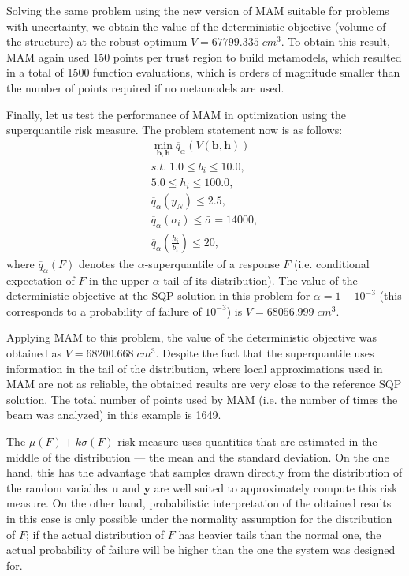 \documentclass{llncs}
\begin{document}
Solving the same problem using the new version of MAM suitable for problems with uncertainty, we obtain the value of the deterministic objective (volume of the structure) at the robust optimum $V = 67799.335\; cm^3$. To obtain this result, MAM again used 150 points per trust region to build metamodels, which resulted in a total of 1500 function evaluations, which is orders of magnitude smaller than the number of points required if no metamodels are used.

Finally, let us test the performance of MAM in optimization using the superquantile risk measure. The problem statement now is as follows:
\begin{displaymath}
  \begin{array}{c}
    \min\limits_{\boldsymbol b, \boldsymbol h} \overline{q}_\alpha \left(V(\boldsymbol b, \boldsymbol h)\right) \\
    s.t.\;1.0 \le b_i \le 10.0, \\
    5.0 \le h_i \le 100.0, \\    
		\overline{q}_\alpha \left(y_N\right) \le 2.5, \\
    \overline{q}_\alpha \left(\sigma_i\right) \le \bar{\sigma} = 14000, \\
    \overline{q}_\alpha \left(\frac{h_i}{b_i}\right)\le 20,
  \end{array}
\end{displaymath}
where $\overline{q}_\alpha \left(F\right) $ denotes the $\alpha$-superquantile of a response $F$ (i.e. conditional expectation of $F$ in the upper $\alpha$-tail of its distribution). The value of the deterministic objective at the SQP solution in this problem for $\alpha = 1-10^{-3}$ (this corresponds to a probability of failure of $10^{-3}$) is $V = 68056.999\; cm^3$.

Applying MAM to this problem, the value of the deterministic objective was obtained as $V = 68200.668\; cm^3$. Despite the fact that the superquantile uses information in the tail of the distribution, where local approximations used in MAM are not as reliable, the obtained results are very close to the reference SQP solution. The total number of  points used by MAM (i.e. the number of times the beam was analyzed) in this example is 1649.

The $\mu(F ) + k\sigma(F)$ risk measure uses quantities that are estimated in the middle of the distribution --- the mean and the standard deviation. On the one hand, this has the advantage that samples drawn directly from the distribution of the random variables $\boldsymbol u$ and $\boldsymbol y$ are well suited to approximately compute this risk measure. On the other hand, probabilistic interpretation of the obtained results in this case is only possible under the normality assumption for the distribution of $F$; if the actual distribution of $F$ has heavier tails than the normal one, the actual probability of failure will be higher than the one  the system was designed for.
\end{document}
